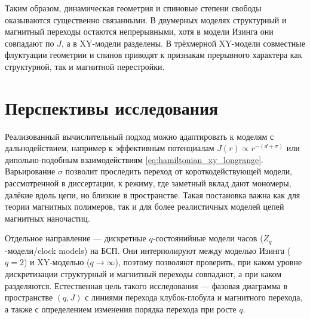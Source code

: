 Таким образом, динамическая геометрия и спиновые степени свободы оказываются существенно связанными. 
В двумерных моделях структурный и магнитный переходы остаются непрерывными, хотя в модели Изинга они совпадают по $J$, а в XY-модели разделены. 
В трёхмерной XY-модели совместные флуктуации геометрии и спинов приводят к признакам прерывного характера как структурной, так и магнитной перестройки. 

\section*{Перспективы исследования}
 
 
 Реализованный вычислительный подход можно адаптировать к моделям с дальнодействием, например к эффективным потенциалам $J(r)\propto r^{-(d+\sigma)}$ или дипольно-подобным взаимодействиям \eqref{eq:hamiltonian_xy_longrange}. 
 Варьирование $\sigma$ позволит проследить переход от короткодействующей модели, рассмотренной в диссертации, к режиму, где заметный вклад дают мономеры, далёкие вдоль цепи, но близкие в пространстве. 
 Такая постановка важна как для теории магнитных полимеров, так и для более реалистичных моделей цепей магнитных наночастиц.
 
 
 
 
 
 
 Отдельное направление --- дискретные $q$-состоянийные модели часов ($Z_q$-модели/clock models) на БСП. 
 Они интерполируют между моделью Изинга ($q=2$) и XY-моделью ($q\to\infty$), поэтому позволяют проверить, при каком уровне дискретизации структурный и магнитный переходы совпадают, а при каком разделяются. 
 Естественная цель такого исследования --- фазовая диаграмма в пространстве $(q,J)$ с линиями перехода клубок-глобула и магнитного перехода, а также с определением изменения порядка перехода при росте $q$.
 
 
 
 
